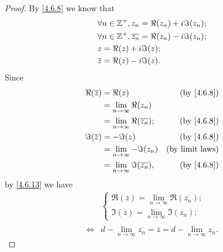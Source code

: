 \begin{proof}
  By \cref{4.6.8} we know that
  \begin{align*}
     & \forall n \in \mathbb{Z}^+, z_n = \Re(z_n) + i \Im(z_n);            \\
     & \forall n \in \mathbb{Z}^+, \overline{z_n} = \Re(z_n) - i \Im(z_n); \\
     & z = \Re(z) + i \Im(z);                                      \\
     & \overline{z} = \Re(z) - i \Im(z).
  \end{align*}
  Since
  \begin{align*}
    \Re(\overline{z}) & = \Re(z)                                   & \text{(by \cref{4.6.8})} \\
                      & = \lim_{n \to \infty} \Re(z_n)                                        \\
                      & = \lim_{n \to \infty} \Re(\overline{z_n}); & \text{(by \cref{4.6.8})} \\
    \Im(\overline{z}) & = -\Im(z)                                  & \text{(by \cref{4.6.8})} \\
                      & = \lim_{n \to \infty} -\Im(z_n)            & \text{(by limit laws)}   \\
                      & = \lim_{n \to \infty} \Im(\overline{z_n}), & \text{(by \cref{4.6.8})}
  \end{align*}
  by \cref{4.6.13} we have
  \begin{align*}
         & \begin{cases}
             \Re(\overline{z}) = \lim_{n \to \infty} \Re(\overline{z_n}); \\
             \Im(\overline{z}) = \lim_{n \to \infty} \Im(\overline{z_n});
           \end{cases}                                    \\
    \iff & d - \lim_{n \to \infty} \overline{z_n} = \overline{z} = \overline{d - \lim_{n \to \infty} z_n}.
  \end{align*}


\end{proof}
